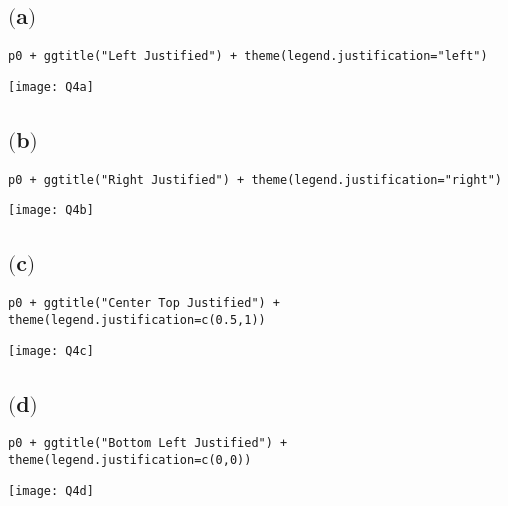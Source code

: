 \documentclass[a4paper,man,natbib]{apa6}
\begin{document}
\subsection{$($a$)$}
\begin{verbatim}
p0 + ggtitle("Left Justified") + theme(legend.justification="left")
\end{verbatim}
\texttt{[image: Q4a]}

\subsection{$($b$)$}
\begin{verbatim}
p0 + ggtitle("Right Justified") + theme(legend.justification="right")
\end{verbatim}
\texttt{[image: Q4b]}

\subsection{$($c$)$}
\begin{verbatim}
p0 + ggtitle("Center Top Justified") + theme(legend.justification=c(0.5,1))
\end{verbatim}
\texttt{[image: Q4c]}

\subsection{$($d$)$}
\begin{verbatim}
p0 + ggtitle("Bottom Left Justified") + theme(legend.justification=c(0,0))
\end{verbatim}
\texttt{[image: Q4d]}
\end{document}
